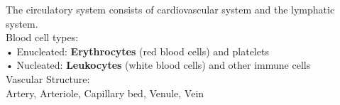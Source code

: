 The circulatory system consists of cardiovascular system and the lymphatic system.\\

Blood cell types:\\
• Enucleated: \textbf{Erythrocytes} (red blood cells) and platelets\\
• Nucleated: \textbf{Leukocytes} (white blood cells) and other immune cells\\

Vascular Structure:\\
Artery, Arteriole, Capillary bed, Venule, Vein